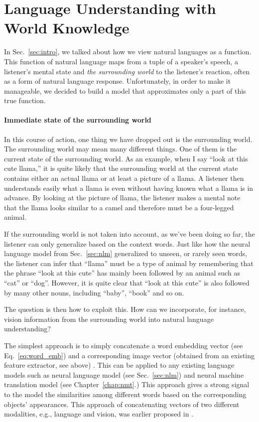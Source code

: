 \documentclass{report}
\begin{document}
\section{Language Understanding with World Knowledge}

In Sec.~\ref{sec:intro}, we talked about how we view natural languages as a
function. This function of natural language maps from a tuple of a speaker's
speech, a listener's mental state and {\em the surrounding world} to the
listener's reaction, often as a form of natural language response.
Unfortunately, in order to make it manageable, we decided to build a model that
approximates only a part of this true function. 

\paragraph{Immediate state of the surrounding world} 

In this course of action, one thing we have dropped out is the surrounding
world. The surrounding world may mean many different things. One of them is
the current state of the surrounding world. As an example, when I say ``look at
this cute llama,'' it is quite likely that the surrounding world at the current
state contains either an actual llama or at least a picture of a llama. A
listener then understands easily what a llama is even without having known what
a llama is in advance. By looking at the picture of llama, the listener makes a
mental note that the llama looks similar to a camel and therefore must be a
four-legged animal.

If the surrounding world is not taken into account, as we've been doing so far,
the listener can only generalize based on the context words. Just like how the
neural language model from Sec.~\ref{sec:nlm} generalized to unseen, or rarely
seen words, the listener can infer that ``llama'' must be a type of animal by
remembering that the phrase ``look at this cute'' has mainly been followed by an
animal such as ``cat'' or ``dog''. However, it is quite clear that ``look at
this cute'' is also followed by many other nouns, including ``baby'', ``book''
and so on.

The question is then how to exploit this. How can we incorporate, for instance,
vision information from the surrounding world into natural language
understanding? 

The simplest approach is to simply concatenate a word embedding vector (see
Eq.~\eqref{eq:word_emb}) and a corresponding image vector (obtained from an
existing feature extractor, see above) \cite{kiela2014learning}. This can be
applied to any existing language models such as neural language model (see
Sec.~\ref{sec:nlm}) and neural machine translation model (see
Chapter~\ref{chap:nmt}.) This approach gives a strong signal to the model the
similarities among different words based on the corresponding objects'
appearances. This approach of concatenating vectors of two different modalities,
e.g., language and vision, was earlier proposed in \cite{weston2010large}. 
\end{document}
